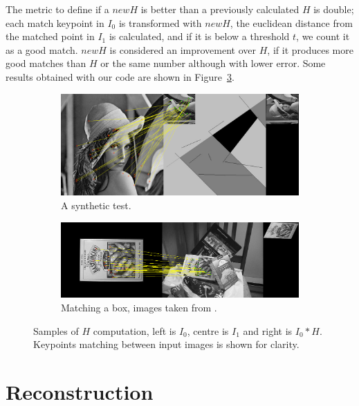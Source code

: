 \documentclass[12pt]{article}
\begin{document}
The metric to define if a $newH$ is better than a previously calculated $H$ is double; each match keypoint in $I_0$ is transformed with $newH$, the euclidean distance from the matched point in $I_1$ is calculated, and if it is below a threshold $t$, we count it as a good match.
$newH$ is considered an improvement over $H$, if it produces more good matches than $H$ or the same number although with lower error.
Some results obtained with our code are shown in Figure~\ref{fig:ransacSample}.

\begin{figure}[htbp!]
        \centering
        \begin{subfigure}[b]{0.6\textwidth}
                \includegraphics[width=\textwidth]{images/ransac2}
                \caption{A synthetic test.}
                \label{fig:ransac1}
        \end{subfigure}    
        \begin{subfigure}[b]{0.6\textwidth}
                \includegraphics[width=\textwidth]{images/ransac1}
                \caption{Matching a box, images taken from \cite{Lowe2004}.}
                \label{fig:ransac2}
        \end{subfigure} 
        \caption{Samples of $H$ computation, left is $I_0$, centre is $I_1$ and right is $I_0 * H$. Keypoints matching between input images is shown for clarity.}\label{fig:ransacSample}
\end{figure}

\FloatBarrier
\section{Reconstruction}
\end{document}
